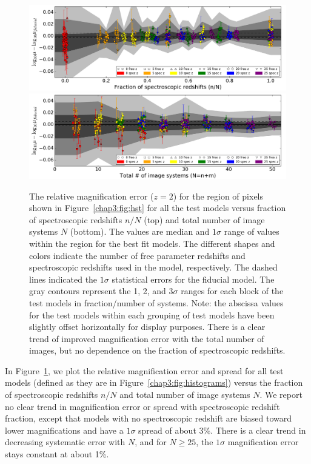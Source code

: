 \begin{figure}
\center
\includegraphics[width=\textwidth]{Chap3/c3f9a.pdf}
\includegraphics[width=\textwidth]{Chap3/c3f9b.pdf}
\caption[Magnification error vs fraction of spec-z and vs total number of images for test models]{The relative magnification error ($z=2$) for the region of pixels shown in Figure~\ref{chap3:fig:hst} for all the test models versus fraction of spectroscopic redshifts $n/N$ (top) and total number of image systems $N$ (bottom). The values are median and $1\sigma$ range of values within the region for the best fit models. The different shapes and colors indicate the number of free parameter redshifts and spectroscopic redshifts used in the model, respectively. The dashed lines indicated the $1\sigma$ statistical errors for the fiducial model. The gray contours represent the 1, 2, and 3$\sigma$ ranges for each block of the test models in fraction/number of systems. Note: the abscissa values for the test models within each grouping of test models have been slightly offset horizontally for display purposes. There is a clear trend of improved magnification error with the total number of images, but no dependence on the fraction of spectroscopic redshifts.}
\label{chap3:fig:specz_fraction}
\end{figure}

In Figure~\ref{chap3:fig:specz_fraction}, we plot the relative magnification error and spread for all test models (defined as they are in Figure~\ref{chap3:fig:histograms}) versus the fraction of spectroscopic redshifts $n/N$ and total number of image systems $N$. We report no clear trend in magnification error or spread with spectroscopic redshift fraction, except that models with no spectroscopic redshift are biased toward lower magnifications and have a $1\sigma$ spread of about 3\%.  There is a clear trend in decreasing systematic error with $N$, and for $N\geq25$, the $1\sigma$ magnification error stays constant at about 1\%.

